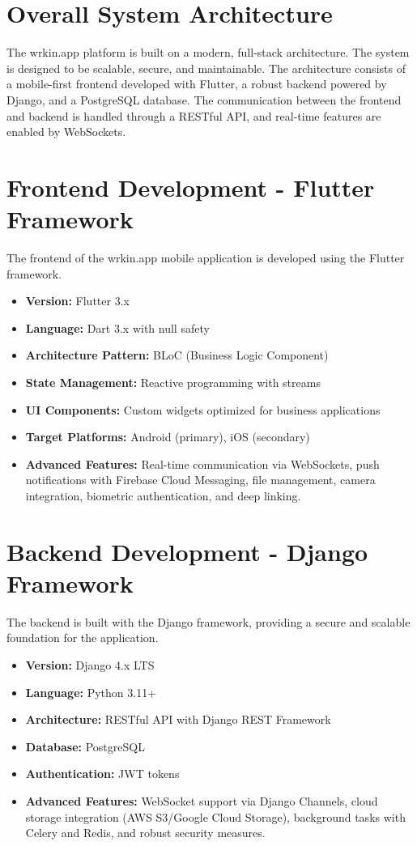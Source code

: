 \section{Overall System Architecture}
The wrkin.app platform is built on a modern, full-stack architecture. The system is designed to be scalable, secure, and maintainable. The architecture consists of a mobile-first frontend developed with Flutter, a robust backend powered by Django, and a PostgreSQL database. The communication between the frontend and backend is handled through a RESTful API, and real-time features are enabled by WebSockets.

\section{Frontend Development - Flutter Framework}
The frontend of the wrkin.app mobile application is developed using the Flutter framework.
\begin{itemize}
    \item \textbf{Version:} Flutter 3.x
    \item \textbf{Language:} Dart 3.x with null safety
    \item \textbf{Architecture Pattern:} BLoC (Business Logic Component)
    \item \textbf{State Management:} Reactive programming with streams
    \item \textbf{UI Components:} Custom widgets optimized for business applications
    \item \textbf{Target Platforms:} Android (primary), iOS (secondary)
    \item \textbf{Advanced Features:} Real-time communication via WebSockets, push notifications with Firebase Cloud Messaging, file management, camera integration, biometric authentication, and deep linking.
\end{itemize}

\section{Backend Development - Django Framework}
The backend is built with the Django framework, providing a secure and scalable foundation for the application.
\begin{itemize}
    \item \textbf{Version:} Django 4.x LTS
    \item \textbf{Language:} Python 3.11+
    \item \textbf{Architecture:} RESTful API with Django REST Framework
    \item \textbf{Database:} PostgreSQL
    \item \textbf{Authentication:} JWT tokens
    \item \textbf{Advanced Features:} WebSocket support via Django Channels, cloud storage integration (AWS S3/Google Cloud Storage), background tasks with Celery and Redis, and robust security measures.
\end{itemize}

